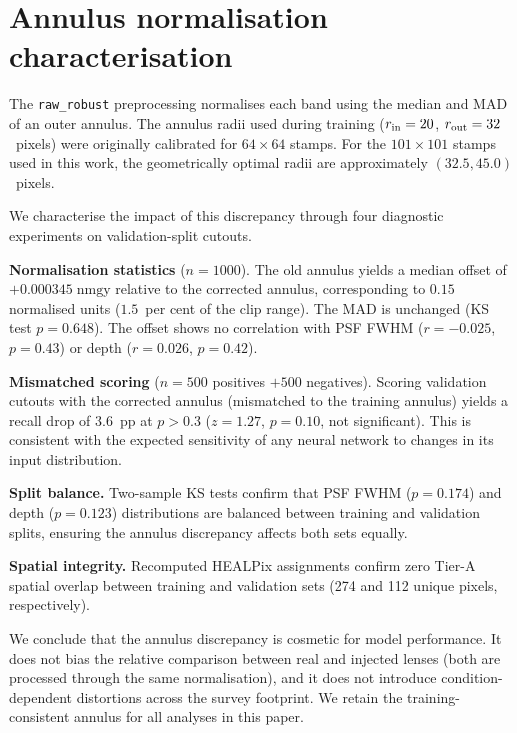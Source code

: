 \documentclass[fleqn,usenatbib]{rasti}
\begin{document}
\appendix
\section{Annulus normalisation characterisation}
\label{app:annulus}

The \texttt{raw\_robust} preprocessing normalises each band using the median and MAD of an outer annulus.  The annulus radii used during training ($r_{\rm in} = 20$, $r_{\rm out} = 32$~pixels) were originally calibrated for $64 \times 64$ stamps.  For the $101 \times 101$ stamps used in this work, the geometrically optimal radii are approximately $(32.5, 45.0)$~pixels.

We characterise the impact of this discrepancy through four diagnostic experiments on validation-split cutouts.

\textbf{Normalisation statistics} ($n = 1000$).  The old annulus yields a median offset of $+0.000345\;\mathrm{nmgy}$ relative to the corrected annulus, corresponding to $0.15$ normalised units ($1.5$~per cent of the clip range).  The MAD is unchanged (KS test $p = 0.648$).  The offset shows no correlation with PSF FWHM ($r = -0.025$, $p = 0.43$) or depth ($r = 0.026$, $p = 0.42$).

\textbf{Mismatched scoring} ($n = 500$ positives $+ 500$ negatives).  Scoring validation cutouts with the corrected annulus (mismatched to the training annulus) yields a recall drop of $3.6$~pp at $p > 0.3$ ($z = 1.27$, $p = 0.10$, not significant).  This is consistent with the expected sensitivity of any neural network to changes in its input distribution.

\textbf{Split balance.}  Two-sample KS tests confirm that PSF FWHM ($p = 0.174$) and depth ($p = 0.123$) distributions are balanced between training and validation splits, ensuring the annulus discrepancy affects both sets equally.

\textbf{Spatial integrity.}  Recomputed HEALPix assignments confirm zero Tier-A spatial overlap between training and validation sets (274 and 112 unique pixels, respectively).

We conclude that the annulus discrepancy is cosmetic for model performance.  It does not bias the relative comparison between real and injected lenses (both are processed through the same normalisation), and it does not introduce condition-dependent distortions across the survey footprint.  We retain the training-consistent annulus for all analyses in this paper.
\end{document}
